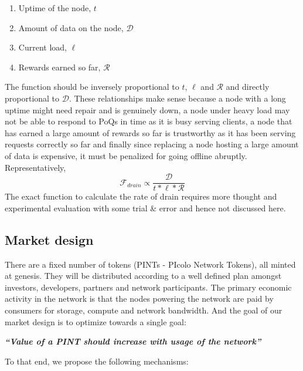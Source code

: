  \begin{enumerate}
	\item Uptime of the node, $t$
	\item Amount of data on the node, $\mathcal{D}$
	\item Current load, $\ell$
	\item Rewards earned so far, $\mathcal{R}$
\end{enumerate}
The function should be inversely proportional to $t$, $\ell$ and $\mathcal{R}$ and directly proportional to $\mathcal{D}$. These relationships make sense because a node with a long uptime might need repair and is genuinely down, a node under heavy load may not be able to respond to PoQs in time as it is busy serving clients, a node that has earned a large amount of rewards so far is trustworthy as it has been serving requests correctly so far and finally since replacing a node hosting a  large amount of data is expensive, it must be penalized for going offline abruptly. Representatively,
\newline
$$ \mathcal{F}_{drain} \propto \frac{\mathcal{D}} {t * \ell * \mathcal{R}}$$
\newline
The exact function to calculate the rate of drain requires more thought and experimental evaluation with some trial \& error and hence not discussed here.

\subsection{Market design}
There are a fixed number of tokens (PINTs - PIcolo Network Tokens), all minted at genesis. They will be distributed according to a well defined plan amongst investors, developers, partners and network participants. The primary economic activity in the network is that the nodes powering the network are paid by consumers for storage, compute and network bandwidth. And the goal of our market design is to optimize towards a single goal:
\begin{center}
	\textit{\large{\textbf{``Value of a PINT should increase with usage of the network''}}}
\end{center}
To that end, we propose the following mechanisms:
